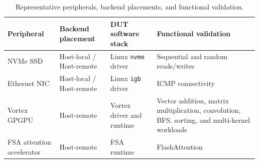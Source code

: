 \begin{table}[t]
\centering
\caption{Representative peripherals, backend placements, and functional validation.}
\label{tab:peripheral-validation}
\small
\setlength{\tabcolsep}{5pt}
\renewcommand{\arraystretch}{1.1}
\begin{tabularx}{\textwidth}{@{}>{\raggedright\arraybackslash}p{}>{\raggedright\arraybackslash}p{}>{\raggedright\arraybackslash}p{}>{\raggedright\arraybackslash}X@{}}
\toprule
Peripheral & Backend placement & DUT software stack & Functional validation \\
\midrule
NVMe SSD & Host-local / Host-remote & Linux \texttt{nvme} driver & Sequential and random reads/writes \\
\addlinespace
Ethernet NIC & Host-local / Host-remote & Linux \texttt{igb} driver & ICMP connectivity \\
\addlinespace
Vortex GPGPU & Host-remote & Vortex driver and runtime & Vector addition, matrix multiplication, convolution, BFS, sorting, and multi-kernel workloads \\
\addlinespace
FSA attention accelerator & Host-remote & FSA runtime & FlashAttention \\
\bottomrule
\end{tabularx}
\end{table}

